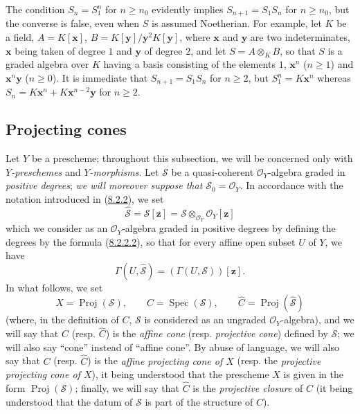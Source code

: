 \begin{remark}[8.2.15]
\label{II.8.2.15}
The condition $S_n=S_1^n$ for $n\geq n_0$ evidently implies
$S_{n+1}=S_1S_n$ for $n\geq n_0$, but the converse is false, even
when $S$ is assumed Noetherian. For example, let $K$ be a field,
$A=K[\mathbf{x}]$, $B=K[\mathbf{y}]/\mathbf{y}^2K[\mathbf{y}]$, where $\mathbf{x}$ and $\mathbf{y}$ are two indeterminates, $\mathbf{x}$ being
taken of degree $1$ and $\mathbf{y}$ of degree $2$, and let $S=A\otimes_KB$, so that
$S$ is a graded algebra over $K$ having a basis consisting of the elements $1$,
$\mathbf{x}^n$ ($n\geq1$) and $\mathbf{x}^n\mathbf{y}$ ($n\geq0$). It is immediate that
$S_{n+1}=S_1S_n$ for $n\geq2$, but $S_1^n=K\mathbf{x}^n$ whereas
$S_n=K\mathbf{x}^n+K\mathbf{x}^{n-2}\mathbf{y}$ for $n\geq2$.
\end{remark}

\subsection{Projecting cones}
\label{subsection:II.8.3}

\begin{env}[8.3.1]
\label{II.8.3.1}
Let $Y$ be a prescheme; throughout this subsection, we will be concerned only
with \emph{$Y$-preschemes} and \emph{$Y$-morphisms}. Let $\mathcal{S}$ be a
quasi-coherent $\mathcal{O}_Y$-algebra graded in \emph{positive degrees};
\emph{we will moreover suppose that $\mathcal{S}_0=\mathcal{O}_Y$}.
In accordance with the notation introduced in
(\hyperref[II.8.2.2]{8.2.2}), we set
\begin{equation}
\label{II.8.3.1.1}
  \widehat{\mathcal{S}}=\mathcal{S}[\mathbf{z}]
  =\mathcal{S}\otimes_{\mathcal{O}_Y}\mathcal{O}_Y[\mathbf{z}]
\tag{8.3.1.1}
\end{equation}
which we consider as an $\mathcal{O}_Y$-algebra graded in positive degrees by
defining the degrees by the formula
(\hyperref[II.8.2.2.2]{8.2.2.2}), so that for every affine open subset $U$
of $Y$, we have
\[
  \Gamma(U,\widehat{\mathcal{S}})=(\Gamma(U,\mathcal{S}))[\mathbf{z}].
\]
In what follows, we set
\begin{equation}
\label{II.8.3.1.2}
  X=\operatorname{Proj}(\mathcal{S}),\qquad
  C=\operatorname{Spec}(\mathcal{S}),\qquad
  \widehat{C}=\operatorname{Proj}(\widehat{\mathcal{S}})
\tag{8.3.1.2}
\end{equation}
(where, in the definition of $C$, $\mathcal{S}$ is considered as an ungraded
$\mathcal{O}_Y$-algebra), and we will say that $C$ (resp.
$\widehat{C}$) is the \emph{affine cone} (resp. \emph{projective cone}) defined
by $\mathcal{S}$; we will also say ``cone'' instead of ``affine cone''. By
abuse of language, we will also say that $C$ (resp. $\widehat{C}$) is the
\emph{affine projecting cone of $X$} (resp. the \emph{projective projecting
cone of $X$}), it being understood that the prescheme $X$ is given in the form
$\operatorname{Proj}(\mathcal{S})$; finally, we will say that $\widehat{C}$ is
the \emph{projective closure} of $C$ (it being understood that the datum of
$\mathcal{S}$ is part of the structure of $C$).
\end{env}

